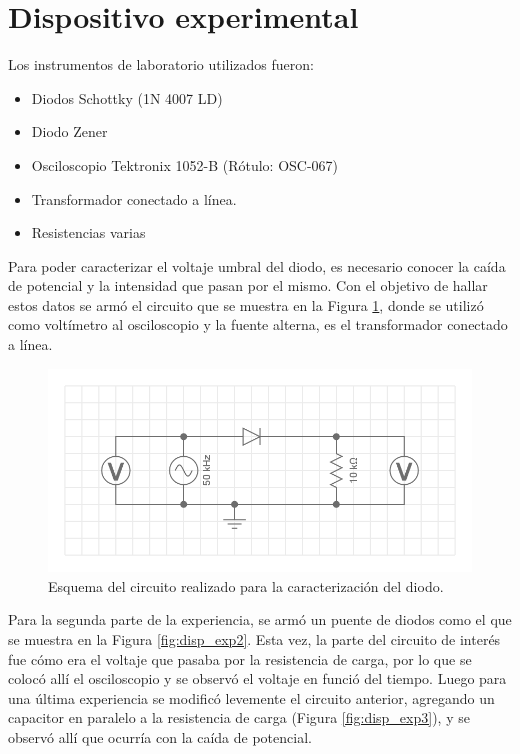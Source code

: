 \documentclass[twoside,twocolumn,a4paper]{article}
\begin{document}

\section{Dispositivo experimental}
Los instrumentos de laboratorio utilizados fueron:
\begin{itemize}
\item 
\label{diodo} Diodos Schottky (1N 4007 LD)%
\item 
\label{zener} Diodo Zener
\item 
\label{osc} Osciloscopio Tektronix 1052-B (R\'otulo: OSC-067) %
\item
\label{trans} Transformador conectado a l\'inea. 
\item Resistencias varias
\end{itemize}

Para poder caracterizar el voltaje umbral del diodo, es necesario conocer la ca\'ida de potencial y la intensidad que pasan por el mismo. Con el objetivo de hallar estos datos se arm\'o el circuito que se muestra en la Figura \ref{fig:dsp_exp}, donde se utiliz\'o como volt\'imetro al osciloscopio y la fuente alterna, es el transformador conectado a l\'inea. 

\begin{figure}[h]
\includegraphics[width=\linewidth]{disp_exp.png}
\caption{Esquema del circuito realizado para la caracterizaci\'on del diodo.}
\label{fig:dsp_exp}
\end{figure}

Para la segunda parte de la experiencia, se arm\'o un puente de diodos como el que se muestra en la Figura \ref{fig:disp_exp2}. Esta vez, la parte del circuito de inter\'es fue c\'omo era el voltaje que pasaba por la resistencia de carga, por lo que se coloc\'o all\'i el osciloscopio y se observ\'o el voltaje en funci\'o del tiempo. Luego para una \'ultima experiencia se modific\'o levemente el circuito anterior, agregando un capacitor en paralelo a la resistencia de carga (Figura \ref{fig:disp_exp3}), y se observ\'o all\'i que ocurr\'ia con la ca\'ida de potencial. 
\end{document}
